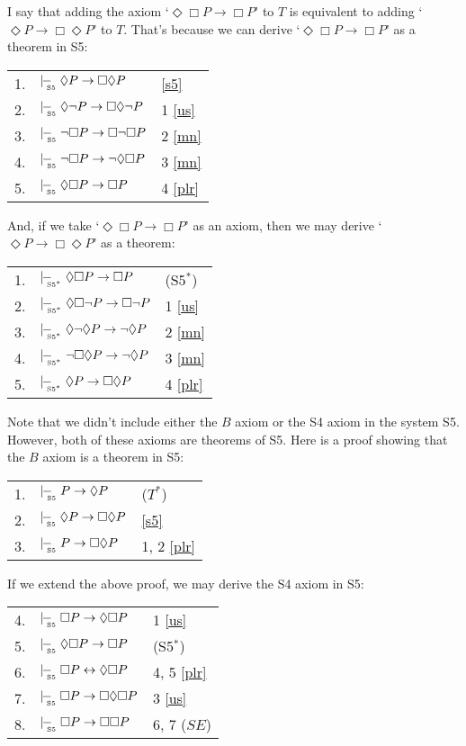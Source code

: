 \documentclass[landscape, two column, full page,reqno]{article}
\newcommand{\p}{\item}
\newcommand{\tnot}{\neg}
\newcommand{\sfiveproves}{\mid\hspace{-3.9pt}-_{\!\!\!\raisebox{-3pt}{\text{\tiny S5}}}\hspace{3pt}}
\newcommand{\sfivepproves}{\mid\hspace{-3.9pt}-_{\!\!\!\raisebox{-3pt}{\text{\tiny S5$^*$}}}\hspace{3pt}}
\newcommand{\ff}{\leftrightarrow}
\newcommand{\D}{\Diamond}
\newcommand{\B}{\Box}
\newcommand{\aproof}[2]{\begin{center}
\begin{tabularx}{#1}{l X l}
#2
\end{tabularx}
\end{center}}
\begin{document}
\p I say that adding the axiom `$\D \B P \to \B P$'  to $T$ is equivalent to adding `$\D P \to \B \D P$' to $T$.  That's because we can derive `$\D \B P \to \B P$' as a theorem in S5:
	\aproof{200pt}{
	1. & $\sfiveproves \D P \to \B \D P$			& \eqref{s5}	\\
	2. & $\sfiveproves \D \tnot P \to \B \D \tnot P$	& 1 \eqref{us}	\\
	3. & $\sfiveproves \tnot \B P \to \B \tnot \B P$	& 2 \eqref{mn}	\\
	4. & $\sfiveproves \tnot \B P \to \tnot \D \B P$	& 3 \eqref{mn}	\\
	5. & $\sfiveproves  \D \B P \to \B P$		& 4 \eqref{plr}
	}
And, if we take `$\D \B P \to \B P$' as an axiom, then we may derive `$\D P \to \B \D P$' as a theorem:
	\aproof{200pt}{
	1. & $\sfivepproves \D \B P \to \B  P$			& (S5$^*$)	\\
	2. & $\sfivepproves \D \B \tnot P \to \B \tnot P$	& 1 \eqref{us}	\\
	3. & $\sfivepproves \D \tnot \D P \to  \tnot \D P$	& 2 \eqref{mn}	\\
	4. & $\sfivepproves \tnot \B \D P \to \tnot \D P$	& 3 \eqref{mn}	\\
	5. & $\sfivepproves  \D P \to \B \D P$			& 4 \eqref{plr}
	}
\p Note that we didn't include either the $B$ axiom or the S4 axiom in the system S5.  However, both of these axioms are theorems of S5.  Here is a proof showing that the $B$ axiom is  a theorem in S5:
\begin{center}
\begin{tabularx}{200pt}{l X l}
1. & $\sfiveproves P \to \D P$				& ($T^*$)	\\
2. & $\sfiveproves \D P \to \B \D P$			& \eqref{s5}	\\
3. & $\sfiveproves P \to \B \D P$			& 1, 2 \eqref{plr}
\end{tabularx}	
\end{center}  
If we extend the above proof, we may derive the S4 axiom in S5:
	\aproof{200pt}{
4. & $\sfiveproves \B P \to \D \B P$				& 1 \eqref{us}	\\
5. & $\sfiveproves \D \B P \to \B  P$						& (S5$^*$)		\\
6. & $\sfiveproves \B P \ff \D \B P$				& 4, 5 \eqref{plr}	\\
7. & $\sfiveproves \B P \to \B \D \B P$			& 3 \eqref{us}	\\
8. & $\sfiveproves \B P \to \B \B P$				& 6, 7 ($SE$)
	}
\end{document}
